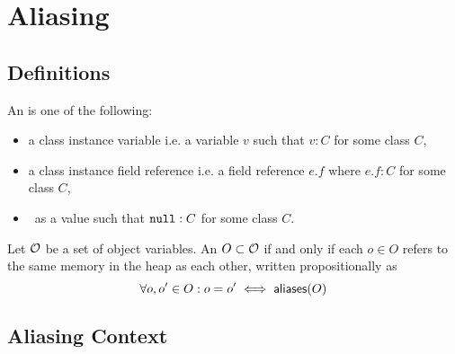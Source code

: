 \section{Aliasing}

\subsection{Definitions}

An  is one of the following:
\begin{itemize}
  \item a class instance variable i.e. a variable $v$ such that $v : C$ for some class $C$,
  \item a class instance field reference i.e. a field reference $e.f$ where $e.f : C$ for some class $C$,
  \item \cnull \ as a value such that $\texttt{null} : C$ for some class $C$.
\end{itemize}
Let $\mathcal{O}$ be a set of object variables.
An $O \subset \mathcal{O}$  if and only if
each $o \in O$ refers to the same memory in the heap as each other,
written propositionally as
$$
  \forall o, o^\prime \in O : o = o^\prime \iff \textsf{aliases}(O)
$$

\subsection{Aliasing Context}

